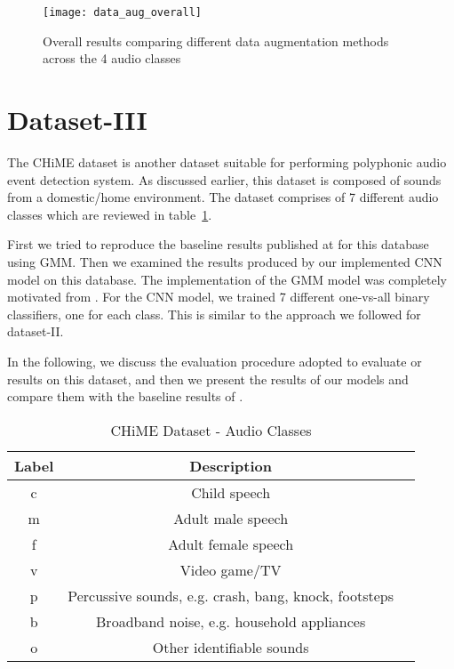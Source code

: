 \begin{figure}[!htb] 
\centering 
\texttt{[image: data\_aug\_overall]}
\caption[Overall results comparing different data augmentation methods across the 4 audio classes]{Overall results comparing different data augmentation methods across the 4 audio classes}
\label{fig:data_aug_overall} 
\end{figure}


\section{Dataset-III}

The CHiME dataset is another dataset suitable for performing polyphonic audio event detection system. As discussed earlier, this dataset is composed of sounds from a domestic/home environment. The dataset comprises of 7 different audio classes which are reviewed in table~\ref{tab:audio_classes_db3}. 

First we tried to reproduce the baseline results published at \cite{foster2015chime} for this database using GMM. Then we examined the results produced by our implemented CNN model on this database. The implementation of the GMM model was completely motivated from \cite{foster2015chime}. For the CNN model, we trained 7 different one-vs-all binary classifiers, one for each class. This is similar to the approach we followed for dataset-II. 

In the following, we discuss the evaluation procedure adopted to evaluate or results on this dataset, and then we present the results of our models and compare them with the baseline results of \cite{foster2015chime}. 

\begin{table}[tb]
\caption[CHiME Dataset - Audio Classes]{CHiME Dataset - Audio Classes}
\label{tab:audio_classes_db3}
\centering
\begin{tabular}{ccc}
\toprule
Label & Description  \\
\midrule
c	& Child speech\\
m	& Adult male speech\\
f & Adult female speech\\
v 	& Video game/TV\\
p & Percussive sounds, e.g. crash, bang, knock, footsteps\\
b & Broadband noise, e.g. household appliances\\
o & Other identifiable sounds\\
\bottomrule 
\end{tabular}
\end{table}

